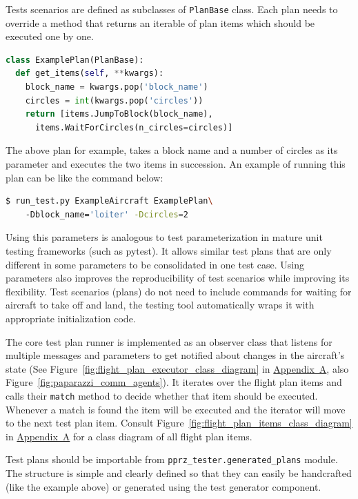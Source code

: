 Tests scenarios are defined as subclasses of \verb|PlanBase| class. Each plan needs to override a method that returns an iterable of plan items which should be executed one by one. 
\begin{lstlisting}[language=Python, basicstyle=\linespread{0.1}]
class ExamplePlan(PlanBase):
  def get_items(self, **kwargs):
    block_name = kwargs.pop('block_name')
    circles = int(kwargs.pop('circles'))
    return [items.JumpToBlock(block_name),
      items.WaitForCircles(n_circles=circles)]
\end{lstlisting}
The above plan for example, takes a block name and a number of circles as its parameter and executes the two items in succession. An example of running this plan can be like the command below:
\begin{lstlisting}[language=bash]
$ run_test.py ExampleAircraft ExamplePlan\ 
    -Dblock_name='loiter' -Dcircles=2
\end{lstlisting}
Using this parameters is analogous to test parameterization in mature unit testing frameworks (such as pytest). It allows similar test plans that are only different in some parameters to be consolidated in one test case.
Using parameters also improves the reproducibility of test scenarios while improving its flexibility. Test scenarios (plans) do not need to include commands for waiting for aircraft to take off and land, the testing tool automatically wraps it with appropriate initialization code.

The core test plan runner is implemented as an observer class that listens for multiple messages and parameters to get notified about changes in the aircraft's state (See Figure~\ref{fig:flight_plan_executor_class_diagram} in \hyperref[appendixa]{Appendix~A}, also Figure~\ref{fig:paparazzi_comm_agents}). It iterates over the flight plan items and calls their \verb|match| method to decide whether that item should be executed. Whenever a match is found the item will be executed and the iterator will move to the next test plan item. Consult Figure~\ref{fig:flight_plan_items_class_diagram} in \hyperref[appendixa]{Appendix~A} for a class diagram of all flight plan items.

Test plans should be importable from \verb|pprz_tester.generated_plans| module. The structure is simple and clearly defined so that they can easily be handcrafted (like the example above) or generated using the test generator component.

